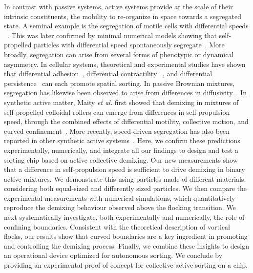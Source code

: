 \documentclass[aps,pre,twocolumn,amsmath,amssymb,notitlepage,superscriptaddress,longbibliography,nofootinbib,10pt]{revtex4-1}
\begin{document}
In contrast with passive systems, active systems provide at the scale of their intrinsic constituents, the mobility to re-organize in space towards a segregated state. A seminal example is the segregation of motile cells with differential speeds ~\cite{JONES1989287}. This was later confirmed by minimal numerical models showing that self-propelled particles with differential speed spontaneously segregate~\cite{PhysRevE.84.031927,mccandlish2012spontaneous}. More broadly, segregation can arise from several forms of phenotypic or dynamical asymmetry. In cellular systems, theoretical and experimental studies have shown that differential adhesion~\cite{steinberg1963reconstruction,graner1992simulation,glazier1993simulation,foty2005differential,PhysRevLett.100.248702,mehes2012collective,mones2015anomalous}, differential contractility ~\cite{harris1976cell,krieg2008tensile,o2016unidirectional,kindberg2021eph,skamrahl2023cellular,PhysRevLett.134.138401}, and differential persistence~\cite{bothe2026contact} can each promote spatial sorting. In passive Brownian mixtures, segregation has likewise been observed to arise from differences in diffusivity~\cite{PhysRevLett.116.058301,PhysRevLett.132.098301}. In synthetic active matter, Maity \textit{et al.} first showed that demixing in mixtures of self-propelled colloidal rollers can emerge from differences in self-propulsion speed, through the combined effects of differential motility, collective motion, and curved confinement~\cite{PhysRevLett.131.178304}. More recently, speed-driven segregation has also been reported in other synthetic active systems~\cite{alvarez2025segregation}. Here, we confirm these predictions experimentally, numerically, and integrate all our findings to design and test a sorting chip based on active collective demixing.
Our new measurements show that a difference in self-propulsion speed is sufficient to drive demixing in binary active mixtures. We demonstrate this using particles made of different materials, considering both equal-sized and differently sized particles. We then compare the experimental measurements with numerical simulations, which quantitatively reproduce the demixing behaviour observed above the flocking transition. We next systematically investigate, both experimentally and numerically, the role of confining boundaries. Consistent with the theoretical description of vortical flocks, our results show that curved boundaries are a key ingredient in promoting and controlling the demixing process. Finally, we combine these insights to design an operational device optimized for autonomous sorting. We conclude by providing an experimental proof of concept for collective active sorting on a chip.
\end{document}
